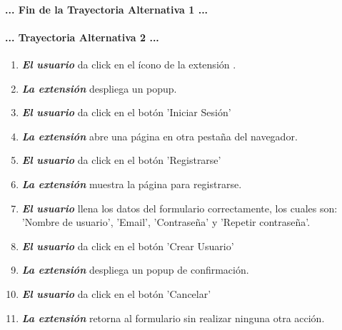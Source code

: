 \documentclass[12pt, a4paper, titlepage]{report}
\newcommand*{\img}[1]{%
    \raisebox{-.3\baselineskip}{%
        \texttt{[image: \#1]}%
    }%
}
\begin{document}
				\paragraph{... Fin de la Trayectoria Alternativa 1 ...}
				
				
				\paragraph{... Trayectoria Alternativa 2 ...}
				\begin{enumerate}
				    
				    \item \textbf{\textit{El usuario}} da click en el ícono de la extensión \img{imagenes/Disenio/Componente_1/UI_icon_escom.png}.
				    
				    \item \textbf{\textit{La extensión}} despliega un popup.
					
					\item \textbf{\textit{El usuario}} da click en el botón 'Iniciar Sesión' \img{imagenes/Disenio/Componente_1/UI_btn_login.png}
					
					\item \textbf{\textit{La extensión}} abre una página en otra pestaña del navegador.
					
					\item \textbf{\textit{El usuario}} da click en el botón 'Registrarse' \img{imagenes/Disenio/Componente_1/UI_btn_logup.png}
					
					\item \textbf{\textit{La extensión}} muestra la página para registrarse.
					
					\item \textbf{\textit{El usuario}} llena los datos del formulario correctamente, los cuales son: 'Nombre de usuario', 'Email', 'Contraseña' y 'Repetir contraseña'.
					
					\item \textbf{\textit{El usuario}} da click en el botón 'Crear Usuario' \img{imagenes/Disenio/Componente_1/UI_btn_newUser.png}
					
					\item \textbf{\textit{La extensión}} despliega un popup de confirmación.
					
					\item \textbf{\textit{El usuario}} da click en el botón 'Cancelar' \img{imagenes/Disenio/Componente_1/UI_btn_cancelNewUser.png}
					
			        \item \textbf{\textit{La extensión}} retorna al formulario sin realizar ninguna otra acción.
					
				\end{enumerate}
\end{document}
